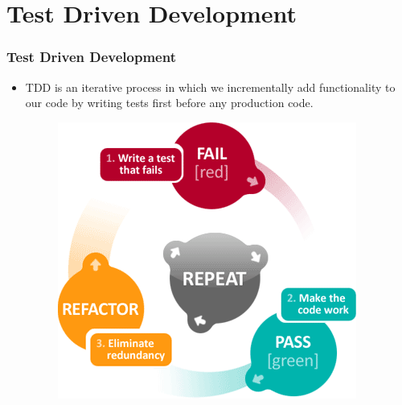 \documentclass[10pt,t,xcolor=dvipsnames]{beamer}
\begin{document}
\section{Test Driven Development}
\begin{frame}[fragile]
\frametitle{Test Driven Development}
\pause
\begin{itemize}[<+->]
\item TDD is an \alert{iterative} process in which we \alert{incrementally} add functionality to our code by \alert{writing tests first} before any production code.
\begin{figure}
\centering
\includegraphics[scale=0.4]{../images/tdd-red-green-refactor-diagram.png} 
\end{figure}
\end{itemize}
\end{frame}
\end{document}
